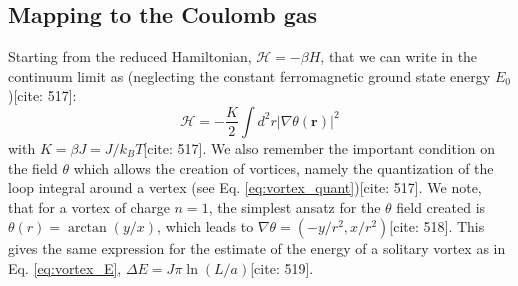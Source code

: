 \documentclass[11pt]{article}
\begin{document}
\subsection{Mapping to the Coulomb gas}

Starting from the reduced Hamiltonian, $\mathcal{H} = -\beta H$, that we can write in the continuum limit as (neglecting the constant ferromagnetic ground state energy $E_0$)[cite: 517]:
\begin{equation}
\mathcal{H} = -\frac{K}{2} \int d^2r |\nabla \theta(\mathbf{r})|^2 \label{eq:H_reduced}
\end{equation}
with $K = \beta J = J / k_B T$[cite: 517]. We also remember the important condition on the field $\theta$ which allows the creation of vortices, namely the quantization of the loop integral around a vertex (see Eq. \eqref{eq:vortex_quant})[cite: 517]. We note, that for a vortex of charge $n=1$, the simplest ansatz for the $\theta$ field created is $\theta(r) = \arctan(y/x)$, which leads to $\nabla \theta = (-y/r^2, x/r^2)$[cite: 518]. This gives the same expression for the estimate of the energy of a solitary vortex as in Eq. \eqref{eq:vortex_E}, $\Delta E = J \pi \ln(L/a)$[cite: 519].
\end{document}
